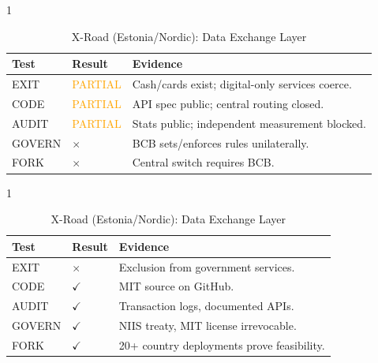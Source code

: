 \documentclass{article}
\begin{document}
\begin{table}[p]
    \begin{subtable}{1\textwidth}
        \centering
        \caption{Pix (Brazil): Central Bank Payment}
        \begin{tabular}{@{}llp{7cm}@{}}
            \toprule
            \textbf{Test} & \textbf{Result} & \textbf{Evidence} \\
            \midrule
            EXIT & \textcolor{orange}{PARTIAL} & Cash/cards exist; digital-only services coerce. \\
            CODE & \textcolor{orange}{PARTIAL} & API spec public; central routing closed. \\
            AUDIT & \textcolor{orange}{PARTIAL} & Stats public; independent measurement blocked. \\
            GOVERN & $\times$ & BCB sets/enforces rules unilaterally. \\
            FORK & $\times$ & Central switch requires BCB. \\
            \bottomrule
        \end{tabular}
    \end{subtable}

    \begin{subtable}{1\textwidth}
        \centering
        \caption{X-Road (Estonia/Nordic): Data Exchange Layer}
        \begin{tabular}{@{}llp{7cm}@{}}
            \toprule
            \textbf{Test} & \textbf{Result} & \textbf{Evidence} \\
            \midrule
            EXIT & $\times$ & Exclusion from government services. \\
            CODE & $\checkmark$ & MIT source on GitHub. \\
            AUDIT & $\checkmark$ & Transaction logs, documented APIs. \\
            GOVERN & $\checkmark$ & NIIS treaty, MIT license irrevocable. \\
            FORK & $\checkmark$ & 20+ country deployments prove feasibility. \\
            \bottomrule
        \end{tabular}
    \end{subtable}


\end{table}
\end{document}
